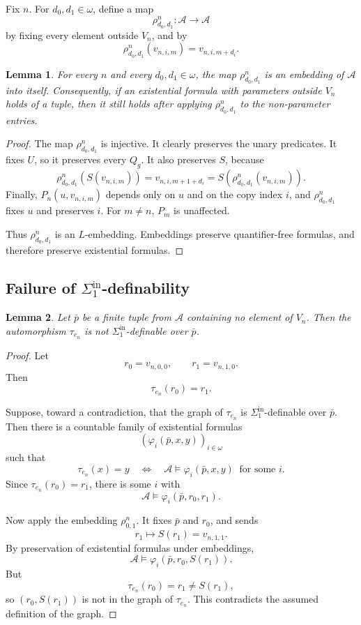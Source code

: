 \documentclass[12pt]{article}
\newtheorem{lemma}{Lemma}
\begin{document}
Fix $n$.  For $d_0,d_1\in\omega$, define a map
\[
\rho^{n}_{d_0,d_1}:\mathcal A\to\mathcal A
\]
by fixing every element outside $V_n$, and by
\[
\rho^{n}_{d_0,d_1}(v_{n,i,m})=v_{n,i,m+d_i}.
\]

\begin{lemma}
For every $n$ and every $d_0,d_1\in\omega$, the map
$\rho^{n}_{d_0,d_1}$ is an embedding of $\mathcal A$ into itself.
Consequently, if an existential formula with parameters outside $V_n$
holds of a tuple, then it still holds after applying $\rho^{n}_{d_0,d_1}$
to the non-parameter entries.
\end{lemma}

\begin{proof}
The map $\rho^{n}_{d_0,d_1}$ is injective.  It clearly preserves the unary predicates.  It fixes $U$, so it preserves every $Q_g$.  It also preserves $S$, because
\[
\rho^{n}_{d_0,d_1}(S(v_{n,i,m}))
=
v_{n,i,m+1+d_i}
=
S(\rho^{n}_{d_0,d_1}(v_{n,i,m})).
\]
Finally, $P_n(u,v_{n,i,m})$ depends only on $u$ and on the copy index $i$, and $\rho^{n}_{d_0,d_1}$ fixes $u$ and preserves $i$.  For $m\neq n$, $P_m$ is unaffected.

Thus $\rho^{n}_{d_0,d_1}$ is an $L$-embedding.  Embeddings preserve quantifier-free formulas, and therefore preserve existential formulas.
\end{proof}

\subsection*{Failure of $\Sigma^{\mathrm{in}}_1$-definability}

\begin{lemma}
Let $\bar p$ be a finite tuple from $\mathcal A$ containing no element of
$V_n$.  Then the automorphism $\tau_{e_n}$ is not
$\Sigma^{\mathrm{in}}_1$-definable over $\bar p$.
\end{lemma}

\begin{proof}
Let
\[
r_0=v_{n,0,0},\qquad r_1=v_{n,1,0}.
\]
Then
\[
\tau_{e_n}(r_0)=r_1.
\]

Suppose, toward a contradiction, that the graph of $\tau_{e_n}$ is
$\Sigma^{\mathrm{in}}_1$-definable over $\bar p$.  Then there is a countable
family of existential formulas
\[
(\varphi_i(\bar p,x,y))_{i\in\omega}
\]
such that
\[
\tau_{e_n}(x)=y
\quad\Longleftrightarrow\quad
\mathcal A\models \varphi_i(\bar p,x,y)
\ \text{ for some }i.
\]
Since $\tau_{e_n}(r_0)=r_1$, there is some $i$ with
\[
\mathcal A\models \varphi_i(\bar p,r_0,r_1).
\]

Now apply the embedding $\rho^n_{0,1}$.  It fixes $\bar p$ and $r_0$, and sends
\[
r_1\mapsto S(r_1)=v_{n,1,1}.
\]
By preservation of existential formulas under embeddings,
\[
\mathcal A\models \varphi_i(\bar p,r_0,S(r_1)).
\]
But
\[
\tau_{e_n}(r_0)=r_1\neq S(r_1),
\]
so $(r_0,S(r_1))$ is not in the graph of $\tau_{e_n}$.  This contradicts the assumed definition of the graph.
\end{proof}
\end{document}
